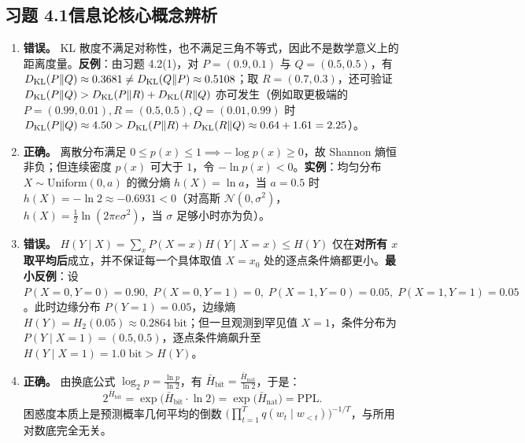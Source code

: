 \subsection*{习题 4.1\quad 信息论核心概念辨析}
\begin{enumerate}[label=(\alph*), leftmargin=1.8em]
  \item \textbf{错误。} KL 散度不满足对称性，也不满足三角不等式，因此不是数学意义上的距离度量。\textbf{反例}：由习题 4.2(1)，对 $P=(0.9,0.1)$ 与 $Q=(0.5,0.5)$，有 $D_{\mathrm{KL}}(P\|Q)\approx 0.3681 \neq D_{\mathrm{KL}}(Q\|P)\approx 0.5108$；取 $R=(0.7,0.3)$，还可验证 $D_{\mathrm{KL}}(P\|Q) > D_{\mathrm{KL}}(P\|R) + D_{\mathrm{KL}}(R\|Q)$ 亦可发生（例如取更极端的 $P=(0.99,0.01), R=(0.5,0.5), Q=(0.01,0.99)$ 时 $D_{\mathrm{KL}}(P\|Q)\approx 4.50 > D_{\mathrm{KL}}(P\|R)+D_{\mathrm{KL}}(R\|Q)\approx 0.64 + 1.61 = 2.25$）。
  \item \textbf{正确。} 离散分布满足 $0 \le p(x) \le 1 \implies -\log p(x) \ge 0$，故 Shannon 熵恒非负；但连续密度 $p(x)$ 可大于 $1$，令 $-\ln p(x) < 0$。\textbf{实例}：均匀分布 $X \sim \mathrm{Uniform}(0, a)$ 的微分熵 $h(X) = \ln a$，当 $a = 0.5$ 时 $h(X) = -\ln 2 \approx -0.6931 < 0$（对高斯 $\mathcal{N}(0, \sigma^2)$，$h(X) = \frac{1}{2}\ln(2\pi e\sigma^2)$，当 $\sigma$ 足够小时亦为负）。
  \item \textbf{错误。} $H(Y \mid X) = \sum_{x} P(X=x) H(Y \mid X=x) \le H(Y)$ 仅在\textbf{对所有 $x$ 取平均后}成立，并不保证每一个具体取值 $X = x_0$ 处的逐点条件熵都更小。\textbf{最小反例}：设 $P(X=0,Y=0)=0.90,\; P(X=0,Y=1)=0,\; P(X=1,Y=0)=0.05,\; P(X=1,Y=1)=0.05$。此时边缘分布 $P(Y=1)=0.05$，边缘熵 $H(Y) = H_2(0.05) \approx 0.2864\;\text{bit}$；但一旦观测到罕见值 $X = 1$，条件分布为 $P(Y\mid X=1) = (0.5, 0.5)$，逐点条件熵飙升至 $H(Y \mid X=1) = 1.0\;\text{bit} > H(Y)$。
  \item \textbf{正确。} 由换底公式 $\log_2 p = \frac{\ln p}{\ln 2}$，有 $\bar{H}_{\mathrm{bit}} = \frac{\bar{H}_{\mathrm{nat}}}{\ln 2}$，于是：
  \[
    2^{\bar{H}_{\mathrm{bit}}} = \exp\!\bigl(\bar{H}_{\mathrm{bit}}\cdot \ln 2\bigr)
    = \exp\!\bigl(\bar{H}_{\mathrm{nat}}\bigr) = \mathrm{PPL}.
  \]
  困惑度本质上是预测概率几何平均的倒数 $\bigl(\prod_{t=1}^T q(w_t\mid w_{<t})\bigr)^{-1/T}$，与所用对数底完全无关。
\end{enumerate}

